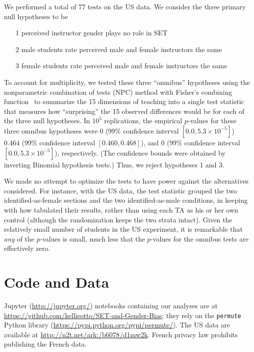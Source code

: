 \documentclass[12pt]{article}
\begin{document}
We performed a total of 77 tests on the US data.
We consider the three primary null hypotheses to be
\begin{enumerate}
   \item[1\sc{us}] perceived instructor gender plays no role in SET
   \item[2\sc{us}] male students rate perceived male and female instructors the same
   \item[3\sc{us}] female students rate perceived male and female instructors the same
\end{enumerate}
To account for multiplicity, we tested these three ``omnibus'' hypotheses 
using the nonparametric combination of tests (NPC) method with Fisher's combining 
function~\citep[Chapter 4]{pesarinSalmaso10} to summarize the 15 dimensions of teaching into
a single test statistic that measures how ``surprising'' the 15 observed differences would be
for each of the three null hypotheses.
In $10^5$ replications, the empirical $p$-values for these three omnibus hypotheses were 
$0$ (99\% confidence interval $[0.0, 5.3\times 10^{-5}]$)
$0.464$ (99\% confidence interval  $[0.460, 0.468]$), and 
$0$ (99\% confidence interval $[0.0, 5.3\times 10^{-5}]$), respectively.
(The confidence bounds were obtained by inverting Binomial hypothesis tests.)
Thus, we reject hypotheses 1{} and 3{}.

We made no attempt to optimize the tests to have power 
against the alternatives considered.
For instance, with the US data, the test statistic
grouped the two identified-as-female sections and the two identified-as-male conditions,
in keeping with how \citet{MacNell2014} tabulated their results,
rather than using each TA as his or her own control (although the randomization keeps the 
two strata intact). 
Given the relatively small number of students in the US experiment, it is remarkable that
\emph{any} of the $p$-values is small, much less that the $p$-values for the omnibus
tests are effectively zero.

\section{Code and Data}
Jupyter (\url{http://jupyter.org/}) notebooks containing our analyses are at
\url{https://github.com/kellieotto/SET-and-Gender-Bias};
they rely on the {\tt permute} Python library (\url{https://pypi.python.org/pypi/permute/}).
The US data are available at \url{http://n2t.net/ark:/b6078/d1mw2k}.
French privacy law prohibits publishing the French data. 
\end{document}
